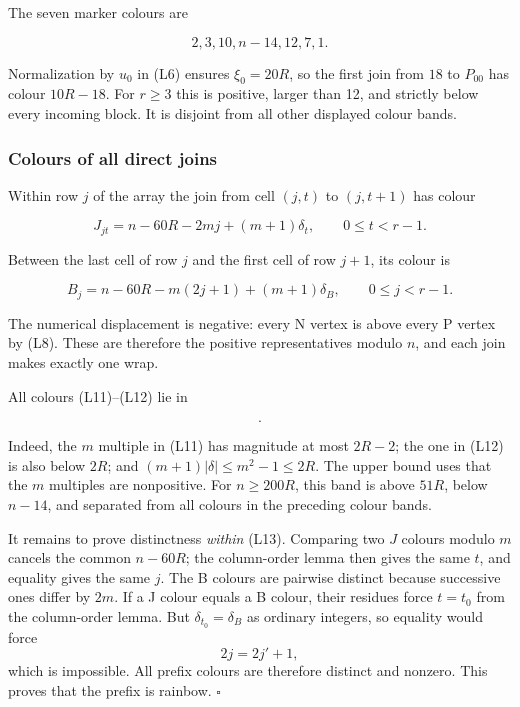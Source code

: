 \documentclass[11pt,a4paper]{article}
\begin{document}
The seven marker colours are

\[
2,3,10,n-14,12,7,1.
\]

Normalization by \(u_0\) in (L6) ensures \(\xi _0=20R\), so the first join from \(18\) to \(P_{00}\) has colour \(10R-18\). For \(r\geq 3\) this is positive, larger than 12, and strictly below every incoming block. It is disjoint from all other displayed colour bands.

\hypertarget{colours-of-all-direct-joins}{%
\subsubsection{Colours of all direct joins}\label{colours-of-all-direct-joins}}

Within row \(j\) of the array the join from cell \((j,t)\) to \((j,t+1)\) has colour

\begin{equation}
J_{jt}=n-60R-2mj+(m+1)\delta_t,
\qquad0\le t<r-1.
\tag{L11}\label{eq:L11}
\end{equation}

Between the last cell of row \(j\) and the first cell of row \(j+1\), its colour is

\begin{equation}
B_j=n-60R-m(2j+1)+(m+1)\delta_B,
\qquad0\le j<r-1.
\tag{L12}\label{eq:L12}
\end{equation}

The numerical displacement is negative: every N vertex is above every P vertex by (L8). These are therefore the positive representatives modulo \(n\), and each join makes exactly one wrap.

All colours (L11)--(L12) lie in

\begin{equation}
[n-64R,n-58R].
\tag{L13}\label{eq:L13}
\end{equation}

Indeed, the \(m\) multiple in (L11) has magnitude at most \(2R-2\); the one in (L12) is also below \(2R\); and \((m+1)|\delta |\leq m^2-1\leq 2R\). The upper bound uses that the \(m\) multiples are nonpositive. For \(n\geq 200R\), this band is above \(51R\), below \(n-14\), and separated from all colours in the preceding colour bands.

It remains to prove distinctness \emph{within} (L13). Comparing two \(J\) colours modulo \(m\) cancels the common \(n-60R\); the column-order lemma then gives the same \(t\), and equality gives the same \(j\). The B colours are pairwise distinct because successive ones differ by \(2m\). If a J colour equals a B colour, their residues force \(t=t_0\) from the column-order lemma. But \(\delta _{t_0}=\delta _B\) as ordinary integers, so equality would force \[
2j=2j'+1,
\] which is impossible. All prefix colours are therefore distinct and nonzero. This proves that the prefix is rainbow. \(\square\)
\end{document}
